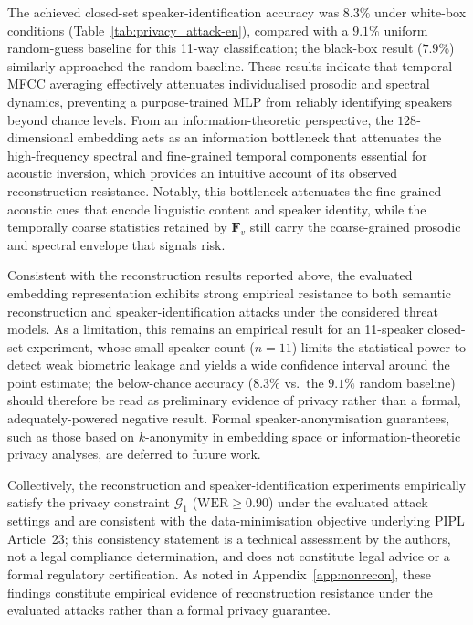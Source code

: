 \documentclass[a4paper,fleqn]{cas-sc}
\begin{document}
The achieved closed-set speaker-identification accuracy was $8.3\%$ under white-box conditions (Table~\ref{tab:privacy_attack-en}), compared with a $9.1\%$ uniform random-guess baseline for this 11-way classification; the black-box result ($7.9\%$) similarly approached the random baseline. These results indicate that temporal MFCC averaging effectively attenuates individualised prosodic and spectral dynamics, preventing a purpose-trained MLP from reliably identifying speakers beyond chance levels. From an information-theoretic perspective, the $128$-dimensional embedding acts as an information bottleneck that attenuates the high-frequency spectral and fine-grained temporal components essential for acoustic inversion, which provides an intuitive account of its observed reconstruction resistance. Notably, this bottleneck attenuates the fine-grained acoustic cues that encode linguistic content and speaker identity, while the temporally coarse statistics retained by $\bm{F}_v$ still carry the coarse-grained prosodic and spectral envelope that signals risk.

Consistent with the reconstruction results reported above, the evaluated embedding representation exhibits strong empirical resistance to both semantic reconstruction and speaker-identification attacks under the considered threat models. As a limitation, this remains an empirical result for an 11-speaker closed-set experiment, whose small speaker count ($n = 11$) limits the statistical power to detect weak biometric leakage and yields a wide confidence interval around the point estimate; the below-chance accuracy ($8.3\%$ vs.\ the $9.1\%$ random baseline) should therefore be read as preliminary evidence of privacy rather than a formal, adequately-powered negative result. Formal speaker-anonymisation guarantees, such as those based on $k$-anonymity in embedding space or information-theoretic privacy analyses, are deferred to future work.

Collectively, the reconstruction and speaker-identification experiments empirically satisfy the privacy constraint $\mathcal{G}_1$ ($\text{WER} \ge 0.90$) under the evaluated attack settings and are consistent with the data-minimisation objective underlying PIPL Article~23; this consistency statement is a technical assessment by the authors, not a legal compliance determination, and does not constitute legal advice or a formal regulatory certification. As noted in Appendix~\ref{app:nonrecon}, these findings constitute empirical evidence of reconstruction resistance under the evaluated attacks rather than a formal privacy guarantee.
\end{document}
